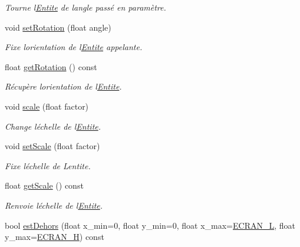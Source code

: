 \begin{DoxyCompactItemize}
\begin{DoxyCompactList}\small\item\em Tourne l\textquotesingle{}\hyperlink{class_entite}{Entite} de l\textquotesingle{}angle passé en paramètre. \end{DoxyCompactList}\item 
void \hyperlink{class_entite_a8623ac815e34b553098f45696ea8918b}{set\+Rotation} (float angle)
\begin{DoxyCompactList}\small\item\em Fixe l\textquotesingle{}orientation de l\textquotesingle{}\hyperlink{class_entite}{Entite} appelante. \end{DoxyCompactList}\item 
float \hyperlink{class_entite_a7f19439f7e7a5028f4b26eff21683de9}{get\+Rotation} () const
\begin{DoxyCompactList}\small\item\em Récupère l\textquotesingle{}orientation de l\textquotesingle{}\hyperlink{class_entite}{Entite}. \end{DoxyCompactList}\item 
void \hyperlink{class_entite_a770f6c53856606c4de768bb942299659}{scale} (float factor)
\begin{DoxyCompactList}\small\item\em Change l\textquotesingle{}échelle de l\textquotesingle{}\hyperlink{class_entite}{Entite}. \end{DoxyCompactList}\item 
void \hyperlink{class_entite_a665939253829baba965ce3ead0f1739c}{set\+Scale} (float factor)
\begin{DoxyCompactList}\small\item\em Fixe l\textquotesingle{}échelle de L\textquotesingle{}entite. \end{DoxyCompactList}\item 
float \hyperlink{class_entite_a5f70868f62049291edf4b245a531a6e0}{get\+Scale} () const
\begin{DoxyCompactList}\small\item\em Renvoie l\textquotesingle{}échelle de l\textquotesingle{}\hyperlink{class_entite}{Entite}. \end{DoxyCompactList}\item 
bool \hyperlink{class_entite_a3e3abd5eac22335f388e6b31675319c1}{est\+Dehors} (float x\+\_\+min=0, float y\+\_\+min=0, float x\+\_\+max=\hyperlink{constantes_8h_a078285dfdd5f8d9caa79aeb3f4eb0a1f}{E\+C\+R\+A\+N\+\_\+L}, float y\+\_\+max=\hyperlink{constantes_8h_a75c426da06c2ec9164baaf36a262fa07}{E\+C\+R\+A\+N\+\_\+H}) const

\end{DoxyCompactItemize}
